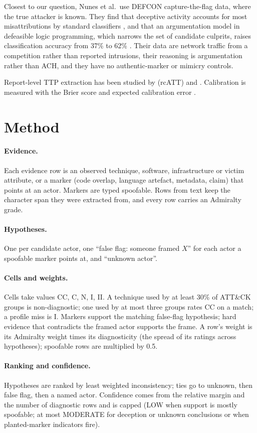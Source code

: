 \documentclass[11pt]{article}
\begin{document}
Closest to our question, Nunes et al.\ use DEFCON capture-the-flag data, where
the true attacker is known. They find that deceptive activity accounts for
most misattributions by standard classifiers \citep{nunes2015}, and that an
argumentation model in defeasible logic programming, which narrows the set of
candidate culprits, raises classification accuracy from 37\% to 62\%
\citep{nunes2016}. Their data are network traffic from a competition rather
than reported intrusions, their reasoning is argumentation rather than ACH,
and they have no authentic-marker or mimicry controls.

Report-level TTP extraction has been studied by \citet{legoy2020} (rcATT) and
\citet{orbinato2022}. Calibration is measured with the Brier score
\citep{brier1950} and expected calibration error \citep{guo2017}.

\section{Method}
\paragraph{Evidence.} Each evidence row is an observed technique, software,
infrastructure or victim attribute, or a marker (code overlap, language
artefact, metadata, claim) that points at an actor. Markers are typed
spoofable. Rows from text keep the character span they were extracted from,
and every row carries an Admiralty grade.
\paragraph{Hypotheses.} One per candidate actor, one ``false flag: someone
framed $X$'' for each actor a spoofable marker points at, and ``unknown
actor''.
\paragraph{Cells and weights.} Cells take values CC, C, N, I, II. A technique
used by at least 30\% of ATT\&CK groups is non-diagnostic; one used by at most
three groups rates CC on a match; a profile miss is I. Markers support the
matching false-flag hypothesis; hard evidence that contradicts the framed
actor supports the frame. A row's weight is its Admiralty weight times its
diagnosticity (the spread of its ratings across hypotheses); spoofable rows
are multiplied by 0.5.
\paragraph{Ranking and confidence.} Hypotheses are ranked by least weighted
inconsistency; ties go to unknown, then false flag, then a named actor.
Confidence comes from the relative margin and the number of diagnostic rows
and is capped (LOW when support is mostly spoofable; at most MODERATE for
deception or unknown conclusions or when planted-marker indicators fire).
\end{document}
